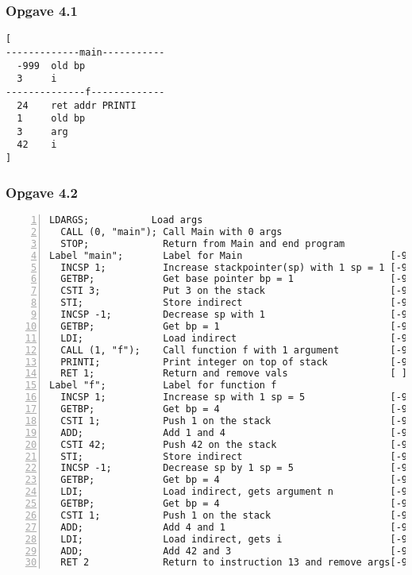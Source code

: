 \subsubsection{Opgave 4.1}
\begin{verbatim}
[
-------------main-----------
  -999  old bp
  3     i
--------------f-------------
  24    ret addr PRINTI
  1     old bp
  3     arg
  42    i
]
\end{verbatim}
\subsubsection{Opgave 4.2}
\begin{Verbatim}[numbers=left]
  LDARGS;           Load args
  CALL (0, "main"); Call Main with 0 args
  STOP;             Return from Main and end program
Label "main";       Label for Main                          [-999]
  INCSP 1;          Increase stackpointer(sp) with 1 sp = 1 [-999 0]
  GETBP;            Get base pointer bp = 1                 [-999 0 1]
  CSTI 3;           Put 3 on the stack                      [-999 0 1 3]
  STI;              Store indirect                          [-999 3 3]
  INCSP -1;         Decrease sp with 1                      [-999 3]
  GETBP;            Get bp = 1                              [-999 3 1]
  LDI;              Load indirect                           [-999 3 3]
  CALL (1, "f");    Call function f with 1 argument         [-999 3 13 1 3]
  PRINTI;           Print integer on top of stack           [-999 3 45]
  RET 1;            Return and remove vals                  [ ]
Label "f";          Label for function f
  INCSP 1;          Increase sp with 1 sp = 5               [-999 3 13 1 3 0]
  GETBP;            Get bp = 4                              [-999 3 13 1 3 0 5]
  CSTI 1;           Push 1 on the stack                     [-999 3 13 1 3 0 5 1]
  ADD;              Add 1 and 4                             [-999 3 13 1 3 0 6]
  CSTI 42;          Push 42 on the stack                    [-999 3 13 1 3 0 6 42]
  STI;              Store indirect                          [-999 3 13 1 3 42 42]
  INCSP -1;         Decrease sp by 1 sp = 5                 [-999 3 13 1 3 42]
  GETBP;            Get bp = 4                              [-999 3 13 1 3 42 4]
  LDI;              Load indirect, gets argument n          [-999 3 13 1 3 42 3]
  GETBP;            Get bp = 4                              [-999 3 13 1 3 42 3 4]
  CSTI 1;           Push 1 on the stack                     [-999 3 13 1 3 42 3 4 1]
  ADD;              Add 4 and 1                             [-999 3 13 1 3 42 3 5]
  LDI;              Load indirect, gets i                   [-999 3 13 1 3 42 3 42]
  ADD;              Add 42 and 3                            [-999 3 13 1 3 42 45]
  RET 2             Return to instruction 13 and remove args[-999 3 45]
\end{Verbatim}